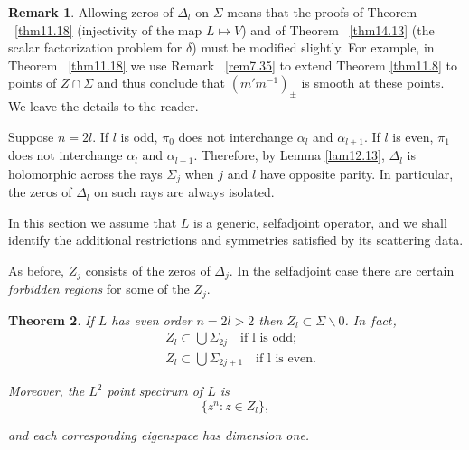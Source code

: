 \documentclass{surv-l}
\theoremstyle{plain}
\newtheorem{theorem}{Theorem}[section]
\theoremstyle{definition}
\newtheorem{remark}[theorem]{Remark}
\numberwithin{equation}{chapter}
\begin{document}
\begin{remark}\label{rem16.4}
Allowing zeros of $\Delta_{l}$ on $\Sigma$ means that the proofs of Theorem ~\ref{thm11.18} (injectivity of the map $L\mapsto V$) and of Theorem ~\ref{thm14.13} (the scalar factorization problem for $\delta$) must be modified slightly. For example, in Theorem ~\ref{thm11.18} we use Remark ~\ref{rem7.35} to extend Theorem \ref{thm11.8} to points of $ Z\cap\Sigma$ and thus conclude that $(m'm^{-1})_{\pm}$ is smooth at these points. We leave the details to the reader.

Suppose $n=2l$.  If $l$ is odd, $\pi_{0}$ does not interchange $\alpha_{l}$ and $\alpha_{l+1}$. If  $l$ is even, $\pi_{1}$ does not interchange $\alpha_{l}$ and $\alpha_{l+1}$. Therefore, by Lemma \ref{lam12.13}, $\Delta_{l}$ is holomorphic across the rays $\Sigma_{j}$ when $j$ and $l$ have opposite parity. In particular, the zeros of $\Delta_{l}$ on such rays are always isolated.

In this section we assume that $L$ is a generic, selfadjoint operator, and we shall identify the additional restrictions and symmetries satisfied by its scattering data.

As before, $Z_{j}$ consists of the zeros of $\Delta_{j}$. In the selfadjoint case there are certain \emph{forbidden regions} for some of the $Z_{j}$.
\end{remark}
\begin{theorem}\label{thm16.5}
If $L$ has even order $n=2l>2$  then $Z_{l}\subset\Sigma\backslash 0$.  In $fact$,
\begin{align*}
&Z_{l}\subset\bigcup\Sigma_{2j}\quad \text{if l is odd};\\
&Z_{l}\subset\bigcup\Sigma_{2j+1}\quad \text{if l is even}.
\end{align*}

Moreover, the $L^{2}$ point spectrum of $L$ is
\setcounter{equation}{5}
\begin{equation}\label{eq16.6}
\{z^{n}:z\in Z_{l}\},
\end{equation}

and each corresponding eigenspace has dimension one.
\end{theorem}
\end{document}
